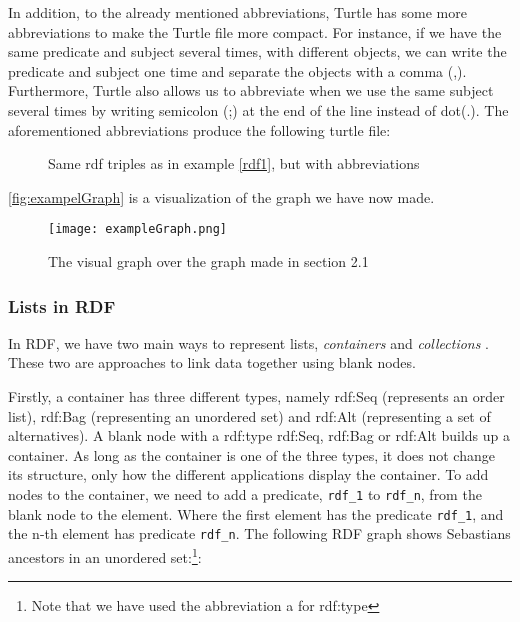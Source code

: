 \para
In addition, to the already mentioned abbreviations, Turtle has some more abbreviations to make the Turtle file more compact. For instance, if we have the same predicate and subject several times, with different objects, we can write the predicate and subject one time and separate the objects with a comma (,). Furthermore, Turtle also allows us to abbreviate when we use the same subject several times by writing semicolon (;) at the end of the line instead of dot(.). The aforementioned abbreviations produce the following turtle file:


\begin{figure}[h]
    \begin{example}
        \label{rdf2}
        Same rdf triples as in example \ref{rdf1}, but with abbreviations
    \end{example}
    
\end{figure}

\autoref{fig:exampelGraph} is a visualization of the graph we have now made.

\begin{figure}
    \centering
    \texttt{[image: exampleGraph.png]}
    \caption{The visual graph over the graph made in section 2.1}
    \label{fig:exampelGraph}
\end{figure}

\subsubsection{Lists in RDF}
In RDF, we have two main ways to represent lists, \emph{containers} and \emph{collections} \autocite[58-63]{FOSWT}. These two are approaches to link data together using blank nodes.

\para
Firstly, a container has three different types, namely rdf:Seq (represents an order list), rdf:Bag (representing an unordered set) and rdf:Alt (representing a set of alternatives). A blank node with a rdf:type rdf:Seq, rdf:Bag or rdf:Alt builds up a container. As long as the container is one of the three types, it does not change its structure, only how the different applications display the container. To add nodes to the container, we need to add a predicate, \lstinline{rdf_1} to \lstinline{rdf_n}, from the blank node to the element. Where the first element has the predicate \lstinline{rdf_1}, and the n-th element has predicate \lstinline{rdf_n}. The following RDF graph shows Sebastians ancestors in an unordered set:\footnote{Note that we have used the abbreviation a for rdf:type}:

